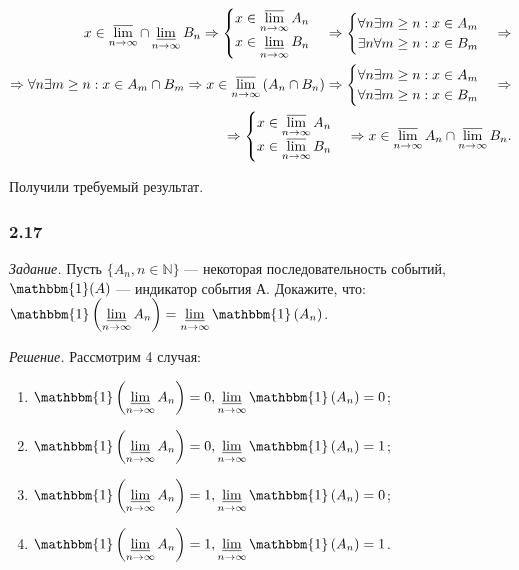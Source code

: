 \documentclass{book}
\begin{document}
\begin{equation*}
\begin{split}
x \in \varlimsup \limits_{ n \to \infty } \cap \varliminf \limits_{n \to \infty } B_n \Rightarrow
\begin{cases}
x \in \varlimsup \limits_{ n \to \infty } A_n \\
x \in \varliminf \limits_{n \to \infty } B_n
\end{cases}
\Rightarrow
\begin{cases}
\forall n \exists m \geq n : x \in A_m \\
\exists n \forall m \geq n : x \in B_m
\end{cases}
\Rightarrow \\
\Rightarrow \forall n \exists m \geq n : x \in A_m \cap B_m \Rightarrow
x \in \varlimsup \limits_{n \to \infty } \left( A_n \cap B_n \right) \Rightarrow
\begin{cases}
\forall n \exists m \geq n : x \in A_m \\
\forall n \exists m \geq n : x \in B_m
\end{cases}
\Rightarrow \\
\Rightarrow
\begin{cases}
x \in \varlimsup \limits_{n \to \infty } A_n \\
x \in \varlimsup \limits_{n \to \infty } B_n
\end{cases}
\Rightarrow
x \in \varlimsup \limits_{n \to \infty } A_n \cap \varlimsup \limits_{n \to \infty } B_n.
\end{split}
\end{equation*}

Получили требуемый результат.

\subsubsection*{2.17}

\textit{Задание.} Пусть $ \{ A_n , n \in \mathbb{N} \} $ --- некоторая последовательность событий,
$ \mathbbm{1} ( A ) $ --- индикатор события А.
Докажите, что:
$ \mathbbm{1} \left( \varliminf \limits_{n\to\infty} A_n \right) = \varliminf \limits_{n\to\infty} \mathbbm{1} \left( A_n \right) $.

\textit{Решение.} Рассмотрим 4 случая:
\begin{enumerate}
\item $\mathbbm{1}\left(\varliminf\limits_{n\to\infty}A_n\right)=0, \varliminf\limits_{n\to\infty}\mathbbm{1}\left(A_n\right)=0$;
\item $\mathbbm{1}\left(\varliminf\limits_{n\to\infty}A_n\right)=0, \varliminf\limits_{n\to\infty}\mathbbm{1}\left(A_n\right)=1$;
\item $\mathbbm{1}\left(\varliminf\limits_{n\to\infty}A_n\right)=1, \varliminf\limits_{n\to\infty}\mathbbm{1}\left(A_n\right)=0$;
\item $\mathbbm{1}\left(\varliminf\limits_{n\to\infty}A_n\right)=1, \varliminf\limits_{n\to\infty}\mathbbm{1}\left(A_n\right)=1$.
\end{enumerate}
\end{document}
